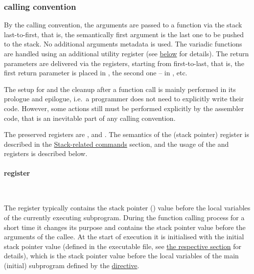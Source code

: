\subsubsection{ calling convention}

\vspace{-0.2cm}

\hypertarget{karma:call:basic}{}
By the  calling convention, the arguments are passed to
a function via the stack last-to-first, that is, the semantically first argument
is the last one to be pushed to the stack.
No additional arguments metadata is used.
The variadic functions are handled using an additional utility register
 (see \hyperlink{r13}{below} for details).
The return parameters are delivered via the registers, starting from 
first-to-last, that is, the first return parameter is placed in ,
the second one -- in , etc.

The setup for and the cleanup after a function call is mainly performed
in its prologue and epilogue, i.e.\ a programmer does not need to explicitly
write their code.
However, some actions still must be performed explicitly
by the assembler code, that is an inevitable part of any calling convention.

The preserved registers are ,  and .
The semantics of the  (stack pointer) register is described in
the \hyperlink{smd:stack}{Stack-related commands} section, and the usage
of the  and  registers is described below.

\vspace{-0.5cm}

\hypertarget{r13}{
    \paragraph{ register}\
}

The  register typically contains the stack pointer () value
before the local variables of the currently executing subprogram.
During the function calling process for a short time it changes its purpose
and contains the stack pointer value before the arguments of
the callee.
At the start of execution it is initialised with the initial stack pointer
value (defined in the executable file, see
\hyperlink{executable}{the respective section} for details),
which is the stack pointer value before the local variables of the main
(initial) subprogram defined by
the \hyperlink{directives:end}{ directive}.

